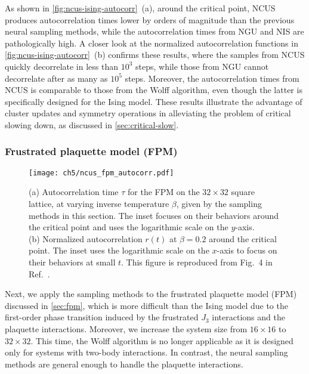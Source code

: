 As shown in \cref{fig:ncus-ising-autocorr}~(a), around the critical point, NCUS produces autocorrelation times lower by orders of magnitude than the previous neural sampling methods, while the autocorrelation times from NGU and NIS are pathologically high. A closer look at the normalized autocorrelation functions in \cref{fig:ncus-ising-autocorr}~(b) confirms these results, where the samples from NCUS quickly decorrelate in less than $10^3$ steps, while those from NGU cannot decorrelate after as many as $10^5$ steps. Moreover, the autocorrelation times from NCUS is comparable to those from the Wolff algorithm, even though the latter is specifically designed for the Ising model. These results illustrate the advantage of cluster updates and symmetry operations in alleviating the problem of critical slowing down, as discussed in \cref{sec:critical-slow}.

\subsubsection{Frustrated plaquette model (FPM)}
\label{sec:ncus-fpm}

\begin{figure}[htb]
\centering
\texttt{[image: ch5/ncus\_fpm\_autocorr.pdf]}
\caption[NCUS results of FPM]{
(a) Autocorrelation time $\tau$ for the FPM on the $32 \times 32$ square lattice, at varying inverse temperature $\beta$, given by the sampling methods in this section.
The inset focuses on their behaviors around the critical point and uses the logarithmic scale on the $y$-axis. \\
(b) Normalized autocorrelation $r(t)$ at $\beta = 0.2$ around the critical point.
The inset uses the logarithmic scale on the $x$-axis to focus on their behaviors at small $t$.
This figure is reproduced from Fig.~4 in Ref.~\cite{wu2021unbiased}.
}
\label{fig:ncus-fpm-autocorr}
\end{figure}

Next, we apply the sampling methods to the frustrated plaquette model (FPM) discussed in \cref{sec:fpm}, which is more difficult than the Ising model due to the first-order phase transition induced by the frustrated $J_3$ interactions and the plaquette interactions. Moreover, we increase the system size from $16 \times 16$ to $32 \times 32$. This time, the Wolff algorithm is no longer applicable as it is designed only for systems with two-body interactions. In contrast, the neural sampling methods are general enough to handle the plaquette interactions.

